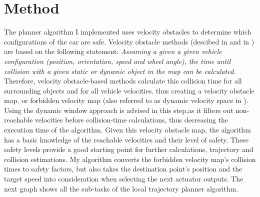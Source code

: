 \section{Method}

The planner algorithm I implemented uses velocity obstacles to determine which configurations of the car are safe. Velocity obstacle methods (descibed in \cite{VelocityForbiddenMap} and in \citep{VelocityObstacles}) are based on the following statement: \textit{Assuming a given a given vehicle configuration (position, orientation, speed and wheel angle), the time until collision with a given static or dynamic object in the map can be calculated.} Therefore, velocity obstacle-based methods calculate this collision time for all surrounding objects and for all vehicle velocities. thus creating a velocity obstacle map, or forbidden velocity map (also referred to as dynamic velocity space in \cite{DynamicMotionPlanningSurvey}). Using the dynamic window approach is advised in this step,as it filters out non-reachable velocities before collision-time calculations, thus decreasing the execution time of the algorithm.
Given this velocity obstacle map, the algorithm has a basic knowledge of the reachable velocities and their level of safety. These safety levels provide a good starting point for further calculations, trajectory and collision estimations. My algorithm converts the forbidden velocity map's collision times to safety factors, but also takes the destination point's position and the target speed into consideration when selecting the next actuator outputs.
The next graph shows all the sub-tasks of the local trajectory planner algorithm.


